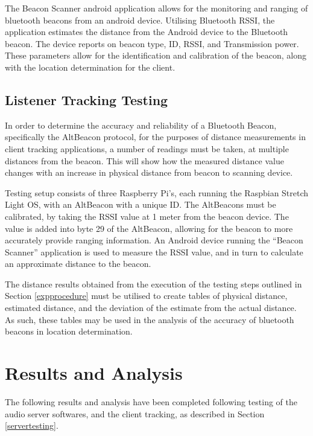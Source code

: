 \documentclass[11pt,a4paper,headinclude=false,footinclude=false]{scrreprt}
\begin{document}
The Beacon Scanner android application allows for the monitoring and
ranging of bluetooth beacons from an android device\cite{beaconscan}.
Utilising Bluetooth RSSI, the application estimates the distance from
the Android device to the Bluetooth beacon. The device reports on beacon
type, ID, RSSI, and Transmission power. These parameters allow for the
identification and calibration of the beacon, along with the location
determination for the client.

\section{Listener Tracking Testing}\label{listener-tracking-testing}

In order to determine the accuracy and reliability of a Bluetooth
Beacon, specifically the AltBeacon protocol, for the purposes of
distance measurements in client tracking applications, a number of
readings must be taken, at multiple distances from the beacon. This will
show how the measured distance value changes with an increase in
physical distance from beacon to scanning device.

Testing setup consists of three Raspberry Pi's, each running the
Raspbian Stretch Light OS, with an AltBeacon with a unique ID. The
AltBeacons must be calibrated, by taking the RSSI value at 1 meter from
the beacon device. The value is added into byte 29 of the AltBeacon,
allowing for the beacon to more accurately provide ranging information.
An Android device running the ``Beacon Scanner'' application is used to
measure the RSSI value, and in turn to calculate an approximate distance
to the beacon.

The distance results obtained from the execution of the testing steps
outlined in Section \ref{expprocedure} must be utilised to create tables
of physical distance, estimated distance, and the deviation of the
estimate from the actual distance. As such, these tables may be used in
the analysis of the accuracy of bluetooth beacons in location
determination.

\chapter{Results and Analysis}\label{results-and-analysis}

The following results and analysis have been completed following testing
of the audio server softwares, and the client tracking, as described in
Section \ref{servertesting}.
\end{document}
